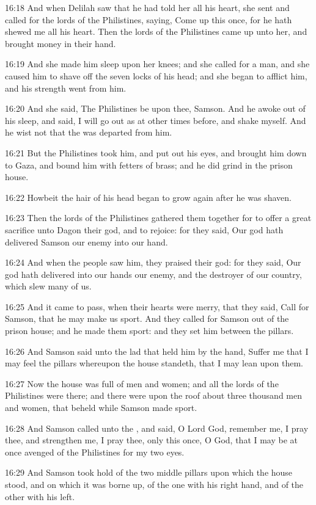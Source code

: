 16:18 And when Delilah saw that he had told her all his heart, she sent and called for the lords of the Philistines, saying, Come up this once, for he hath shewed me all his heart. Then the lords of the Philistines came up unto her, and brought money in their hand.

16:19 And she made him sleep upon her knees; and she called for a man, and she caused him to shave off the seven locks of his head; and she began to afflict him, and his strength went from him.

16:20 And she said, The Philistines be upon thee, Samson. And he awoke out of his sleep, and said, I will go out as at other times before, and shake myself. And he wist not that the \LORD was departed from him.

16:21 But the Philistines took him, and put out his eyes, and brought him down to Gaza, and bound him with fetters of brass; and he did grind in the prison house.

16:22 Howbeit the hair of his head began to grow again after he was shaven.

16:23 Then the lords of the Philistines gathered them together for to offer a great sacrifice unto Dagon their god, and to rejoice: for they said, Our god hath delivered Samson our enemy into our hand.

16:24 And when the people saw him, they praised their god: for they said, Our god hath delivered into our hands our enemy, and the destroyer of our country, which slew many of us.

16:25 And it came to pass, when their hearts were merry, that they said, Call for Samson, that he may make us sport. And they called for Samson out of the prison house; and he made them sport: and they set him between the pillars.

16:26 And Samson said unto the lad that held him by the hand, Suffer me that I may feel the pillars whereupon the house standeth, that I may lean upon them.

16:27 Now the house was full of men and women; and all the lords of the Philistines were there; and there were upon the roof about three thousand men and women, that beheld while Samson made sport.

16:28 And Samson called unto the \LORD, and said, O Lord God, remember me, I pray thee, and strengthen me, I pray thee, only this once, O God, that I may be at once avenged of the Philistines for my two eyes.

16:29 And Samson took hold of the two middle pillars upon which the house stood, and on which it was borne up, of the one with his right hand, and of the other with his left.

